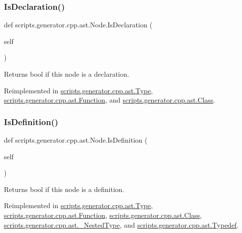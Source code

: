 \subsubsection{\texorpdfstring{IsDeclaration()}{IsDeclaration()}}
{\footnotesize\ttfamily def scripts.\+generator.\+cpp.\+ast.\+Node.\+Is\+Declaration (\begin{DoxyParamCaption}\item[{}]{self }\end{DoxyParamCaption})}

\begin{DoxyVerb}Returns bool if this node is a declaration.\end{DoxyVerb}
 

Reimplemented in \mbox{\hyperlink{classscripts_1_1generator_1_1cpp_1_1ast_1_1_type_a91fb3784f75055327235157cdf98ea38}{scripts.\+generator.\+cpp.\+ast.\+Type}}, \mbox{\hyperlink{classscripts_1_1generator_1_1cpp_1_1ast_1_1_function_a4691458ffe4e8c7eb2b4600e30fac3cc}{scripts.\+generator.\+cpp.\+ast.\+Function}}, and \mbox{\hyperlink{classscripts_1_1generator_1_1cpp_1_1ast_1_1_class_a27fbcb116e330e2c0be9edb285c7ce9b}{scripts.\+generator.\+cpp.\+ast.\+Class}}.

\mbox{\label{classscripts_1_1generator_1_1cpp_1_1ast_1_1_node_a53663c2acef5d6954d065e11d2fd53a1}} 
\subsubsection{\texorpdfstring{IsDefinition()}{IsDefinition()}}
{\footnotesize\ttfamily def scripts.\+generator.\+cpp.\+ast.\+Node.\+Is\+Definition (\begin{DoxyParamCaption}\item[{}]{self }\end{DoxyParamCaption})}

\begin{DoxyVerb}Returns bool if this node is a definition.\end{DoxyVerb}
 

Reimplemented in \mbox{\hyperlink{classscripts_1_1generator_1_1cpp_1_1ast_1_1_type_adb1f8318a4511dd75165f0b7fff9f588}{scripts.\+generator.\+cpp.\+ast.\+Type}}, \mbox{\hyperlink{classscripts_1_1generator_1_1cpp_1_1ast_1_1_function_a31109994f99bcbd9fff7995a6f99785b}{scripts.\+generator.\+cpp.\+ast.\+Function}}, \mbox{\hyperlink{classscripts_1_1generator_1_1cpp_1_1ast_1_1_class_af1c4b935189850c6515c7fe75046c292}{scripts.\+generator.\+cpp.\+ast.\+Class}}, \mbox{\hyperlink{classscripts_1_1generator_1_1cpp_1_1ast_1_1___nested_type_a546b1a780b8e69d244741b8245afe24e}{scripts.\+generator.\+cpp.\+ast.\+\_\+\+Nested\+Type}}, and \mbox{\hyperlink{classscripts_1_1generator_1_1cpp_1_1ast_1_1_typedef_abec1cdfde25bcb813031bb1a44505851}{scripts.\+generator.\+cpp.\+ast.\+Typedef}}.

